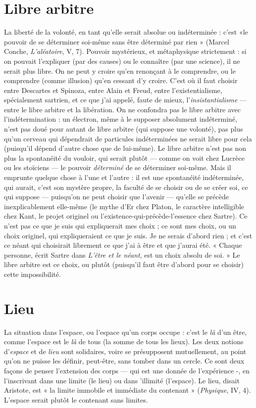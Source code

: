 {\section{Libre arbitre}
La liberté de la volonté, en tant qu’elle serait absolue ou
indéterminée : c’est «le pouvoir de se déterminer soi-même
sans être déterminé par rien » (Marcel Conche, {\it L'aléatoire}, V, 7). Pouvoir
mystérieux, et métaphysique strictement : si on pouvait l’expliquer (par
des causes) ou le connaître (par une science), il ne serait plus libre. On ne peut
y croire qu’en renonçant à le comprendre, ou le comprendre (comme illusion)
qu'en cessant d’y croire. C’est où il faut choisir entre Descartes et Spinoza,
entre Alain et Freud, entre l’existentialisme, spécialement sartrien, et ce que j’ai
appelé, faute de mieux, l’{\it insistantialisme} — entre le libre arbitre et la libération.
On ne confondra pas le libre arbitre avec l’indétermination : un électron,
même à le supposer absolument indéterminé, n’est pas doué pour autant de
libre arbitre (qui suppose une volonté), pas plus qu’un cerveau qui dépendrait
de particules indéterminées ne serait libre pour cela (puisqu'il dépend d’autre
chose que de lui-même). Le libre arbitre n’est pas non plus la spontanéité du
vouloir, qui serait plutôt — comme on voit chez Lucrèce ou les stoïciens — le
pouvoir {\it déterminé} de se déterminer soi-même. Mais il emprunte quelque chose
à l’une et l’autre : il est une spontanéité indéterminée, qui aurait, c’est son mystère
propre, la faculté de se choisir ou de se créer soi, ce qui suppose —
puisqu'on ne peut choisir que l'avenir — qu’elle se précède inexplicablement
elle-même (le mythe d’Er chez Platon, le caractère intelligible chez Kant, le
projet originel ou l’existence-qui-précède-l’essence chez Sartre). Ce n’est pas ce
que je suis qui expliquerait mes choix ; ce sont mes choix, ou un choix originel,
qui expliqueraient ce que je suis. Je ne serais d’abord rien ; et c’est ce néant qui
choisirait librement ce que j'ai à être et que j’aurai été. « Chaque personne, écrit
Sartre dans {\it L'être et le néant}, est un choix absolu de soi. » Le libre arbitre est ce
choix, ou plutôt (puisqu'il faut être d’abord pour se choisir) cette impossibilité.

\section{Lieu}
La situation dans l’espace, ou l’espace qu’un corps occupe : c’est le {\it là}
d’un être, comme l’espace est le {\it là} de tous (la somme de tous les
lieux). Les deux notions d’{\it espace} et de {\it lieu} sont solidaires, voire se présupposent
mutuellement, au point qu’on ne puisse les définir, peut-être, sans tomber dans
un cercle. Ce sont deux façons de penser l’extension des corps — qui est une
donnée de l'expérience -, en l’inscrivant dans une limite (le lieu) ou dans 'illimité
(l’espace). Le lieu, disait Aristote, est « la limite immobile et immédiate du
contenant » ({\it Physique}, IV, 4). L'espace serait plutôt le contenant sans limites.

}
